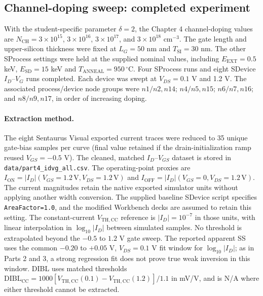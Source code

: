 \subsection{Channel-doping sweep: completed experiment}
With the student-specific parameter $\delta=2$, the Chapter 4
channel-doping values are $N_{\mathrm{CH}}=3\times10^{15}$,
$3\times10^{16}$, $3\times10^{17}$, and
$3\times10^{18}$ cm$^{-3}$. The gate length and upper-silicon
thickness were fixed at $L_G=50$ nm and $T_{\mathrm{SI}}=30$ nm.
The other SProcess settings were held at the supplied nominal values,
including $E_{\mathrm{EXT}}=0.5$ keV, $E_{\mathrm{SD}}=15$ keV
and $T_{\mathrm{ANNEAL}}=950\,^\circ$C. Four SProcess runs
and eight SDevice $I_D$--$V_G$ runs completed.
Each device was swept at $V_{DS}=0.1$ V and 1.2 V.
The associated process/device node groups were
$n1/n2,n14$; $n4/n5,n15$; $n6/n7,n16$; and
$n8/n9,n17$, in order of increasing doping.

\paragraph{Extraction method.}
The eight Sentaurus Visual exported current traces were reduced to
35 unique gate-bias samples per curve (final value retained if the
drain-initialization ramp reused $V_{GS}=-0.5$ V).
The cleaned, matched $I_D$--$V_{GS}$ dataset is stored in
\texttt{data/part4\_idvg\_all.csv}.
The operating-point proxies are
$I_{\mathrm{ON}}=|I_D|(V_{GS}=1.2\mathrm{\,V},V_{DS}=1.2\mathrm{\,V})$
and
$I_{\mathrm{OFF}}=|I_D|(V_{GS}=0,V_{DS}=1.2\mathrm{\,V})$.
The current magnitudes retain the native exported simulator
units without applying another width conversion. The supplied
baseline SDevice script specifies \texttt{AreaFactor=1.0},
and the modified Workbench decks are assumed to retain this setting. The constant-current $V_{\mathrm{TH,CC}}$ reference
is $|I_D|=10^{-7}$ in those units, with linear interpolation
in $\log_{10}|I_D|$ between simulated samples. No threshold
is extrapolated beyond the $-0.5$ to $1.2$ V gate sweep.
The reported apparent SS uses the common $-0.20$ to
$+0.05$ V, $V_{DS}=0.1$ V fit window for
$\log_{10}|I_D|$; as in Parts 2 and 3, a strong regression fit
does not prove true weak inversion in this window.
DIBL uses matched thresholds
$\mathrm{DIBL}_{\mathrm{CC}} =
1000[V_{\mathrm{TH,CC}}(0.1)-V_{\mathrm{TH,CC}}(1.2)]/1.1$
in mV/V, and is N/A where either threshold cannot be extracted.

